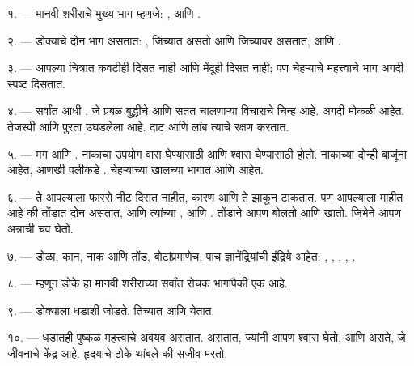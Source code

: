 \VUsaut{4.0mm}
\VUsaut{2.0mm}

\VUsaut{2.4mm}
\VUsaut{3.0mm}

\VUsaut{3.0mm}

१. --- मानवी शरीराचे मुख्य भाग म्हणजे: ,  आणि
.

२. --- डोक्याचे दोन भाग असतात: , जिच्यात  असतो आणि
जिच्यावर  असतात, आणि .

३. --- आपल्या चित्रात कवटीही दिसत नाही आणि मेंदूही दिसत नाही; पण चेहऱ्याचे
महत्त्वाचे भाग अगदी स्पष्ट दिसतात.

४. --- सर्वांत आधी , जे प्रबळ बुद्धीचे आणि सतत चालणाऱ्या विचाराचे
चिन्ह आहे.  अगदी मोकळी आहेत.  तेजस्वी आणि पुरता
उघडलेला आहे. दाट  आणि लांब  त्याचे रक्षण करतात.

५. --- मग  आणि . नाकाचा उपयोग वास घेण्यासाठी आणि
श्वास घेण्यासाठी होतो. नाकाच्या दोन्ही बाजूंना  आहेत, आणखी पलीकडे
. चेहऱ्याच्या खालच्या भागात  आणि  आहेत.

६. --- ते आपल्याला फारसे नीट दिसत नाहीत, कारण  आणि 
ते झाकून टाकतात. पण आपल्याला माहीत आहे की तोंडात दोन  असतात,
 आणि  त्यांच्या , आणि
. तोंडाने आपण बोलतो आणि खातो. जिभेने आपण अन्नाची चव घेतो.

७. --- डोळा, कान, नाक आणि तोंड, बोटांप्रमाणेच, पाच ज्ञानेंद्रियांची इंद्रिये
आहेत: , , , ,
.

८. --- म्हणून डोके हा मानवी शरीराच्या सर्वांत रोचक भागांपैकी एक आहे.

\VUsaut{4.4mm}
\VUsaut{3.0mm}

९. ---  डोक्याला धडाशी जोडते. तिच्यात  आणि
 येतात.

१०. --- धडातही पुष्कळ महत्त्वाचे अवयव असतात.  
असतात, ज्यांनी आपण श्वास घेतो, आणि  असते, जे जीवनाचे केंद्र आहे.
हृदयाचे ठोके थांबले की सजीव मरतो.

